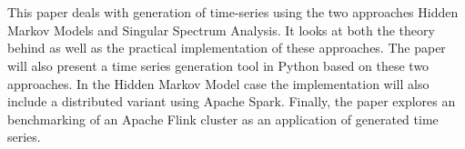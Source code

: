 \chapter{\abstractname}



This paper deals with generation of time-series using the two approaches Hidden Markov Models and Singular Spectrum Analysis. It looks at both the theory behind as well as the practical implementation of these approaches. The paper will also present a time series generation tool in Python based on these two approaches. In the Hidden Markov Model case the implementation will also include a distributed variant using Apache Spark. Finally, the paper explores an benchmarking of an Apache Flink cluster as an application of generated time series. 
